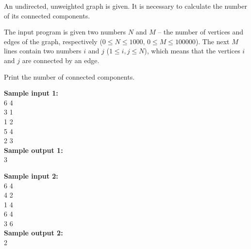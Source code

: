 \documentclass[a4paper]{article}
\begin{document}
An undirected, unweighted graph is given. It is necessary to calculate the number of its connected components.

The input program is given two numbers $N$ and $M$ -- the number of vertices and edges of the graph, respectively ($0 \le N \le 1000$, $0 \le M \le 100000$). The next $M$ lines contain two numbers $i$ and $j$ ($1 \le i, j \le N$), which means that the vertices $i$ and $j$ are connected by an edge.

Print the number of connected components.

\SPACE

\noindent \textbf{Sample input 1:}\\
6 4\\
3 1\\
1 2\\
5 4\\
2 3\\


\noindent \textbf{Sample output 1:}\\
3

\SPACE

\noindent \textbf{Sample input 2:}\\
6 4\\
4 2\\
1 4\\
6 4\\
3 6\\


\noindent \textbf{Sample output 2:}\\
2
\end{document}
